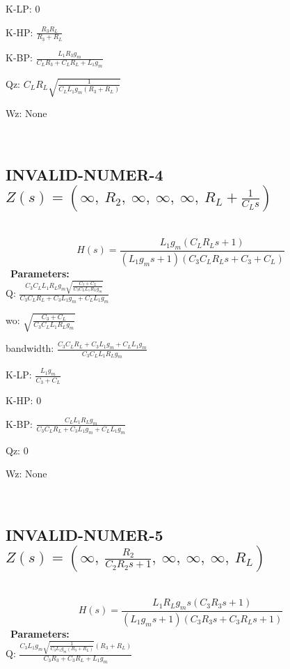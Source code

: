 \documentclass{article}
\begin{document}
K-LP: $0$\ 

K-HP: $\frac{R_{3} R_{L}}{R_{3} + R_{L}}$\ 

K-BP: $\frac{L_{1} R_{3} g_{m}}{C_{L} R_{3} + C_{L} R_{L} + L_{1} g_{m}}$\ 

Qz: $C_{L} R_{L} \sqrt{\frac{1}{C_{L} L_{1} g_{m} \left(R_{3} + R_{L}\right)}}$\ 

Wz: $\text{None}$\ 

\ 

\subsection{INVALID-NUMER-4 $Z(s) = \left( \infty, \  R_{2}, \  \infty, \  \infty, \  \infty, \  R_{L} + \frac{1}{C_{L} s}\right)$ } \ 
\textbf{\[H(s) = \frac{L_{1} g_{m} \left(C_{L} R_{L} s + 1\right)}{\left(L_{1} g_{m} s + 1\right) \left(C_{3} C_{L} R_{L} s + C_{3} + C_{L}\right)}\] } \ 
\textbf{Parameters:}\\ 

Q: $\frac{C_{3} C_{L} L_{1} R_{L} g_{m} \sqrt{\frac{C_{3} + C_{L}}{C_{3} C_{L} L_{1} R_{L} g_{m}}}}{C_{3} C_{L} R_{L} + C_{3} L_{1} g_{m} + C_{L} L_{1} g_{m}}$\ 

wo: $\sqrt{\frac{C_{3} + C_{L}}{C_{3} C_{L} L_{1} R_{L} g_{m}}}$\ 

bandwidth: $\frac{C_{3} C_{L} R_{L} + C_{3} L_{1} g_{m} + C_{L} L_{1} g_{m}}{C_{3} C_{L} L_{1} R_{L} g_{m}}$\ 

K-LP: $\frac{L_{1} g_{m}}{C_{3} + C_{L}}$\ 

K-HP: $0$\ 

K-BP: $\frac{C_{L} L_{1} R_{L} g_{m}}{C_{3} C_{L} R_{L} + C_{3} L_{1} g_{m} + C_{L} L_{1} g_{m}}$\ 

Qz: $0$\ 

Wz: $\text{None}$\ 

\ 

\subsection{INVALID-NUMER-5 $Z(s) = \left( \infty, \  \frac{R_{2}}{C_{2} R_{2} s + 1}, \  \infty, \  \infty, \  \infty, \  R_{L}\right)$ } \ 
\textbf{\[H(s) = \frac{L_{1} R_{L} g_{m} s \left(C_{3} R_{3} s + 1\right)}{\left(L_{1} g_{m} s + 1\right) \left(C_{3} R_{3} s + C_{3} R_{L} s + 1\right)}\] } \ 
\textbf{Parameters:}\\ 

Q: $\frac{C_{3} L_{1} g_{m} \sqrt{\frac{1}{C_{3} L_{1} g_{m} \left(R_{3} + R_{L}\right)}} \left(R_{3} + R_{L}\right)}{C_{3} R_{3} + C_{3} R_{L} + L_{1} g_{m}}$\ 
\end{document}
